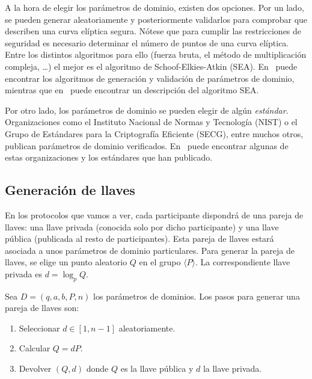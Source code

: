 A la hora de elegir los parámetros de dominio, existen dos opciones. Por un lado, se pueden generar aleatoriamente y posteriormente validarlos para comprobar que describen una curva elíptica segura. Nótese que para cumplir las restricciones de seguridad es necesario determinar el número de puntos de una curva elíptica. Entre los distintos algoritmos para ello (fuerza bruta, el método de multiplicación compleja, \ldots) el mejor es el algoritmo de Schoof-Elkies-Atkin (SEA). En~\cite[cap. 4]{Hankerson:2003} puede encontrar los algoritmos de generación y validación de parámetros de dominio, mientras que en~\cite[cap. XI]{Silverman:2009} puede encontrar un descripción del algoritmo SEA.

Por otro lado, los parámetros de dominio se pueden elegir de algún \emph{estándar}. Organizaciones como el Instituto Nacional de Normas y Tecnología (NIST) o el Grupo de Estándares para la Criptografía Eficiente (SECG), entre muchos otros, publican
parámetros de dominio verificados. En~\cite[apéndice B]{Hankerson:2003} puede encontrar algunas de estas organizaciones y los estándares que han publicado.

\subsection{Generación de llaves}
\label{sub:Pareja de llaves}

En los protocolos que vamos a ver, cada participante dispondrá de una pareja de llaves: una llave privada (conocida solo por dicho participante) y una llave pública (publicada al resto de participantes). Esta pareja de llaves estará asociada a unos parámetros de dominio particulares. Para generar la pareja de llaves, se elige un punto aleatorio $Q$ en el grupo $\langle P \rangle$. La correspondiente llave privada es $d = \log_p Q$.

\begin{algoritmo}\label{alg:pareja de llaves}
    Sea $D = (q, a, b, P, n)$ los parámetros de dominios. Los pasos para generar una pareja de llaves son:
    \begin{enumerate}
        \item Seleccionar $d \in [1, n -1]$ aleatoriamente.
        \item Calcular $Q = d P$.
        \item Devolver $(Q, d)$ donde $Q$ es la llave pública y $d$ la llave privada.
    \end{enumerate}
\end{algoritmo}


